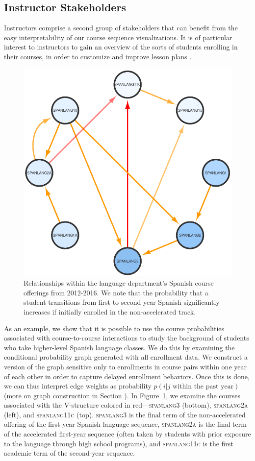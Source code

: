 \subsection{Instructor Stakeholders}
\label{sec:instructor_stakeholders}

Instructors comprise a second group of stakeholders that can benefit from
the easy interpretability of our course sequence visualizations. It is
of particular interest to instructors to gain an overview of the sorts
of students enrolling in their courses, in order to customize
and improve lesson plans \cite{Leaver2002}.

\begin{figure}[h]
    \centering
    \includegraphics[width=0.4\columnwidth]{Figs/final-spanlang.pdf}  
    \caption{Relationships within the language department's Spanish course offerings from 2012-2016. We note that the probability that a student transitions from first to second year Spanish significantly increases if initially enrolled in the non-accelerated track.}
    \label{fig:spanlang}
\end{figure}

As an example, we show that it is possible to use the course probabilities associated with course-to-course interactions to study the background of students who take higher-level Spanish language classes. We do this by examining the conditional probability graph generated with
all enrollment data. We construct a version of the graph sensitive only to
enrollments in course pairs within one year of each other in order to
capture delayed enrollment behaviors. Once this is done, we can thus interpret edge
weights as probability $p(i|j \text{ within the past year})$ (more on graph construction in Section ). In
Figure~\ref{fig:spanlang}, we examine the courses associated with the
V-structure colored in red---\textsc{spanlang3} (bottom),
\textsc{spanlang2a} (left), and \textsc{spanlang11c}
(top). \textsc{spanlang3} is the final term of the non-accelerated
offering of the first-year Spanish language sequence,
\textsc{spanlang2a} is the final term of the accelerated first-year
sequence (often taken by students with prior exposure to the language
through high school programs), and \textsc{spanlang11c} is the first
academic term of the second-year sequence.

